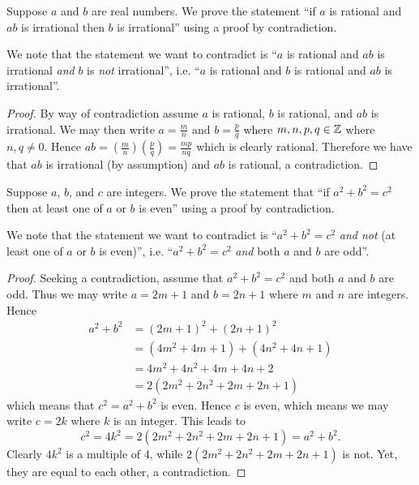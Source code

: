 \begin{example}
    Suppose $a$ and $b$ are real numbers. We prove the statement ``if $a$ is rational and $ab$ is irrational then $b$ is irrational'' using a proof by contradiction.

    We note that the statement we want to contradict is ``$a$ is rational and $ab$ is irrational \textit{and} $b$ is \textit{not} irrational'', i.e. ``$a$ is rational and $b$ is rational and $ab$ is irrational''.
    \begin{proof}
        By way of contradiction assume $a$ is rational, $b$ is rational, and $ab$ is irrational. We may then write $a = \frac mn$ and $b = \frac pq$ where $m, n, p, q \in \mathbb{Z}$ where $n, q \neq 0$. Hence $ab = \left(\frac mn\right)\left(\frac pq\right) = \frac{mp}{nq}$ which is clearly rational. Therefore we have that $ab$ is irrational (by assumption) and $ab$ is rational, a contradiction.
    \end{proof}
\end{example}

\begin{example}
    Suppose $a$, $b$, and $c$ are integers. We prove the statement that ``if $a^2 + b^2 = c^2$ then at least one of $a$ or $b$ is even'' using a proof by contradiction.

    We note that the statement we want to contradict is ``$a^2 + b^2 = c^2$ \textit{and not} (at least one of $a$ or $b$ is even)'', i.e. ``$a^2 + b^2 = c^2$ \textit{and} both $a$ and $b$ are odd''.
    \begin{proof}
        Seeking a contradiction, assume that $a^2 + b^2 = c^2$ and both $a$ and $b$ are odd. Thus we may write $a = 2m + 1$ and $b = 2n + 1$ where $m$ and $n$ are integers. Hence
        \begin{align*}
            a^2 + b^2 &= (2m+1)^2 + (2n+1)^2\\
            &= (4m^2+4m+1) + (4n^2+4n+1)\\
            &= 4m^2 + 4n^2 + 4m + 4n + 2\\
            &= 2(2m^2 + 2n^2 + 2m + 2n +1)
        \end{align*}
        which means that $c^2 = a^2 + b^2$ is even. Hence $c$ is even, which means we may write $c = 2k$ where $k$ is an integer. This leads to
        \[
            c^2 = 4k^2 = 2(2m^2 + 2n^2 + 2m + 2n + 1) = a^2 + b^2.
        \]
        Clearly $4k^2$ is a multiple of 4, while $2(2m^2 + 2n^2 + 2m + 2n + 1)$ is not. Yet, they are equal to each other, a contradiction.
    \end{proof}
\end{example}

